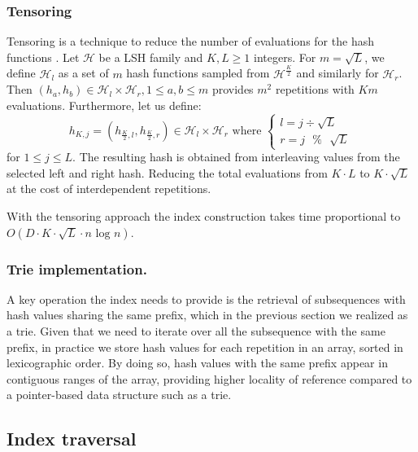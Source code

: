\subsubsection*{Tensoring}
Tensoring is a technique to reduce the number of evaluations for the hash functions \cite{christianitensoring}.
Let $\mathcal{H}$ be a LSH family and $K,L\geq 1$ integers. 
For $m=\sqrt{L}$,
we define $\mathcal{H}_l$ as a set of $m$ hash functions sampled from $\mathcal{H}^{\frac{K}{2}}$ and similarly for $\mathcal{H}_r$. Then $\left(h_a,h_b\right) \in \mathcal{H}_l\times \mathcal{H}_r, 1\leq a,b\leq m$ provides $m^2$ repetitions with $Km$ evaluations.
Furthermore, let us define:
\begin{equation}
h_{K,j}=\left(h_{\frac{K}{2},l},h_{\frac{K}{2},r}\right) \in \mathcal{H}_{l}\times \mathcal{H}_{r} \text{ where } 
\begin{cases}
    l = j  \div \sqrt{L}\\
    r = j \text{ }\% \text{ } \sqrt{L}
\end{cases}
\end{equation}
for $1 \leq j\leq L$.
\newline
The resulting hash is obtained from interleaving values from the selected left and right hash.
Reducing the total evaluations from $K\cdot L$ to $K\cdot \sqrt{L}$ at the cost of interdependent repetitions.
\begin{corollary}
    With the tensoring approach the index construction takes time proportional to $O(D\cdot K\cdot \sqrt{L} \cdot n\text{ log }n)$.
\end{corollary}

\subsubsection*{Trie implementation.}
A key operation the index needs to provide is the retrieval of subsequences with hash values sharing the same prefix, which in the previous section we realized as a trie.
Given that we need to iterate over all the subsequence with the same prefix, in practice
we store hash values for each repetition in an array, sorted in lexicographic order.
By doing so, hash values with the same prefix appear in contiguous ranges of the array,
providing higher locality of reference compared to a pointer-based data structure such as a trie.

\subsection{Index traversal}
